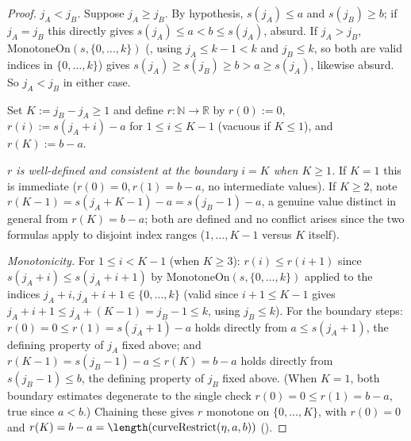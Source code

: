 \begin{proof}
  \emph{$j_A < j_B$.} Suppose $j_A \ge j_B$. By hypothesis, $s(j_A) \le a$ and $s(j_B) \ge b$; if
  $j_A = j_B$ this directly gives $s(j_A) \le a < b \le s(j_A)$, absurd. If $j_A > j_B$,
  $\mathrm{MonotoneOn}(s,\{0,\dots,k\})$ (, using $j_A\le k-1<k$ and
  $j_B\le k$, so both are valid indices in $\{0,\dots,k\}$) gives $s(j_A) \ge s(j_B)
  \ge b > a \ge s(j_A)$, likewise absurd. So $j_A < j_B$ in either case.

  Set $K := j_B - j_A \ge 1$ and define $r \colon \mathbb{N} \to \mathbb{R}$ by $r(0) := 0$, $r(i) :=
  s(j_A+i)-a$ for $1 \le i \le K-1$ (vacuous if $K \le 1$), and $r(K) := b-a$.

  \emph{$r$ is well-defined and consistent at the boundary $i=K$ when $K\ge1$.} If $K=1$ this is
  immediate ($r(0)=0,r(1)=b-a$, no intermediate values). If $K\ge 2$, note $r(K-1) = s(j_A+K-1)-a =
  s(j_B-1)-a$, a genuine value distinct in general from $r(K)=b-a$; both are defined and no
  conflict arises since the two formulas apply to disjoint index ranges ($1,\dots,K-1$ versus $K$
  itself).

  \emph{Monotonicity.} For $1 \le i < K-1$ (when $K \ge 3$): $r(i) \le r(i+1)$ since $s(j_A+i) \le
  s(j_A+i+1)$ by $\mathrm{MonotoneOn}(s,\{0,\dots,k\})$ applied to the indices $j_A+i,j_A+i+1 \in
  \{0,\dots,k\}$ (valid since $i+1\le K-1$ gives $j_A+i+1 \le j_A+(K-1) = j_B-1 \le k$, using
  $j_B\le k$). For the boundary steps: $r(0)=0 \le r(1) = s(j_A+1)-a$ holds directly from $a \le
  s(j_A+1)$, the defining property of $j_A$ fixed above; and $r(K-1) = s(j_B-1)-a \le r(K)=b-a$
  holds directly from $s(j_B-1) \le b$, the defining property of $j_B$ fixed above. (When $K=1$,
  both boundary estimates degenerate to the single check $r(0)=0\le r(1)=b-a$, true since $a<b$.)
  Chaining these gives $r$ monotone on $\{0,\dots,K\}$, with $r(0)=0$ and
  $r(K)=b-a=\length(\mathrm{curveRestrict}(\eta,a,b))$ ().


\end{proof}
